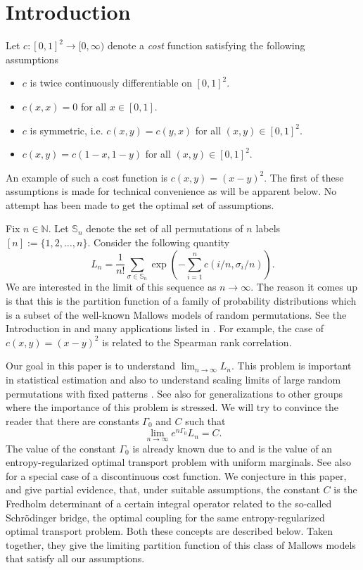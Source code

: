 \documentclass{amsart}
\newcommand{\NN}{\mathbb{N}}
\newcommand{\perm}{\mathbb{S}}
\begin{document}
\section{Introduction}
Let $c:[0,1]^2 \rightarrow [0, \infty)$ denote a \textit{cost} function satisfying the following assumptions
\begin{itemize}
\item $c$ is twice continuously differentiable on $[0,1]^2$.
\item $c(x,x)=0$ for all $x\in [0,1]$.
\item $c$ is symmetric, i.e. $c(x,y)=c(y,x)$ for all $(x,y)\in [0,1]^2$.
\item $c(x,y)=c(1-x, 1-y)$ for all $(x,y)\in [0,1]^2$.
\end{itemize}
An example of such a cost function is $c(x,y)=(x-y)^2$. The first of these assumptions is made for technical convenience as will be apparent below. No attempt has been made to get the optimal set of assumptions. 


Fix $n\in \NN$. Let $\perm_n$ denote the set of all permutations of $n$ labels $[n]:=\{1,2,\ldots, n\}$. Consider the following quantity 
\begin{equation}\label{eq:paritionfnln}
L_n = \frac{1}{n!} \sum_{\sigma \in \perm_n} \exp\left( - \sum_{i=1}^n c(i/n, \sigma_i/n) \right). 
\end{equation}
We are interested in the limit of this sequence as $n\rightarrow \infty$. The reason it comes up is that this is the partition function of a family of probability distributions which is a subset of the well-known Mallows models \cite{Mallows57} of random permutations. See the Introduction in \cite{Mukherjee16} and many applications listed in \cite[Chapters 5 and 6]{Diaconisbook}. For example, the case of $c(x,y)=(x-y)^2$ is related to the Spearman rank correlation. 

Our goal in this paper is to understand $\lim_{n\rightarrow \infty} L_n$. This problem is important in statistical estimation \cite{Mukherjee16} and also to understand scaling limits of large random permutations with fixed patterns \cite{KKRW20}. See also \cite[Section 2e]{DiaconisRam} for generalizations to other groups where the importance of this problem is stressed. We will try to convince the reader that there are constants $\Gamma_0$ and $C$ such that 
\begin{equation}\label{eq:paritionlimit}
\lim_{n\rightarrow \infty} e^{n \Gamma_0} L_n =C.
\end{equation}  
The value of the constant $\Gamma_0$ is already known due to \cite{Mukherjee16} and is the value of an entropy-regularized optimal transport problem with uniform marginals. See also \cite{Starr09} for a special case of a discontinuous cost function. We conjecture in this paper, and give partial evidence, that, under suitable assumptions, the constant $C$ is the Fredholm determinant  \cite[Definition 14.35]{van22} of a certain integral operator related to the so-called Schr\"{o}dinger bridge, the optimal coupling for the same entropy-regularized optimal transport problem. Both these concepts are described below. Taken together, they give the limiting partition function of this class of Mallows models that satisfy all our assumptions. 
\end{document}
